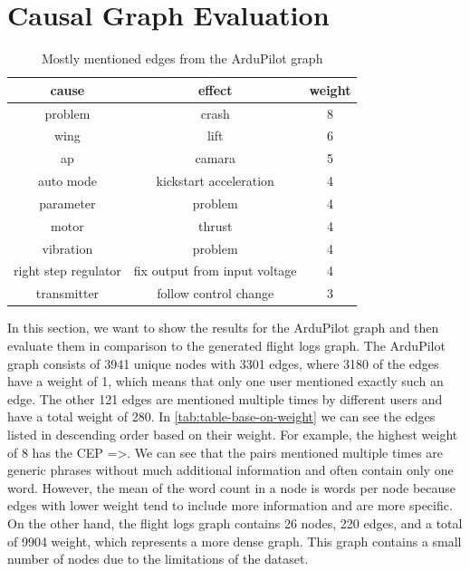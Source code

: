 \section{Causal Graph Evaluation}\label{sec:causal-graph-evaluation}
\begin{table}
    \begin{center}
        \begin{tabular}[t]{||c c c||}
            \hline
            cause                & effect                        & weight \\ [0.5ex]
            \hline\hline
            problem              & crash                         & 8      \\ \hline
            wing                 & lift                          & 6      \\ \hline
            ap                   & camara                        & 5      \\ \hline
            auto mode            & kickstart acceleration        & 4      \\ \hline
            parameter            & problem                       & 4      \\ \hline
            motor                & thrust                        & 4      \\ \hline
            vibration            & problem                       & 4      \\ \hline
            right step regulator & fix output from input voltage & 4      \\ \hline
            transmitter          & follow control change         & 3      \\ \hline
        \end{tabular}
        \caption{Mostly mentioned edges from the ArduPilot graph}\label{tab:table-base-on-weight}
    \end{center}
\end{table}
In this section, we want to show the results for the ArduPilot graph and then evaluate them in comparison to the generated flight logs graph.
The ArduPilot graph consists of 3941 unique nodes with 3301 edges, where 3180 of the edges have a weight of 1, which means that only one user mentioned exactly such an edge.
The other 121 edges are mentioned multiple times by different users and have a total weight of 280.
In \autoref{tab:table-base-on-weight} we can see the edges listed in descending order based on their weight.
For example, the highest weight of 8 has the \ac{CEP} =>.
We can see that the pairs mentioned multiple times are generic phrases without much additional information and often contain only one word.
However, the mean of the word count in a node is  words per node because edges with lower weight tend to include more information and are more specific.
On the other hand, the flight logs graph contains 26 nodes, 220 edges, and a total of 9904 weight, which represents a more dense graph.
This graph contains a small number of nodes due to the limitations of the dataset.

